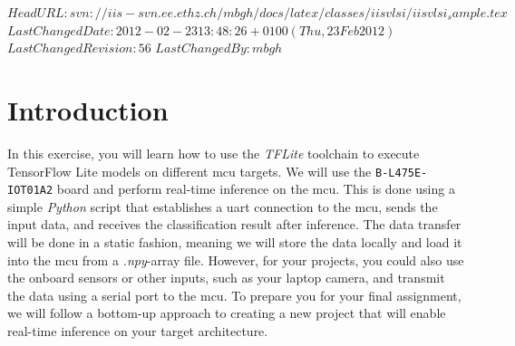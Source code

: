 \documentclass[parskip=half,notes,cadrem,toolver]{iisvlsi}
\begin{document}
%
%
%
\course{}
\coursenr{}
\docvers{}
\lastchange{}
%
%
%


%
\svnidlong
{$HeadURL: svn://iis-svn.ee.ethz.ch/mbgh/docs/latex/classes/iisvlsi/iisvlsi_sample.tex $}
{$LastChangedDate: 2012-02-23 13:48:26 +0100 (Thu, 23 Feb 2012) $}
{$LastChangedRevision: 56 $}
{$LastChangedBy: mbgh $}
%
%
\maketitle
%


%
\section{Introduction}

In this exercise, you will learn how to use the \textit{TFLite} toolchain to execute TensorFlow Lite models on different \gls{mcu} targets. We will use the \texttt{B-L475E-IOT01A2} board and perform real-time inference on the \gls{mcu}. This is done using a simple \textit{Python} script that establishes a \gls{uart} connection to the \gls{mcu}, sends the input data, and receives the classification result after inference. The data transfer will be done in a static fashion, meaning we will store the data locally and load it into the \gls{mcu} from a \textit{.npy}-array file. However, for your projects, you could also use the onboard sensors or other inputs, such as your laptop camera, and transmit the data using a serial port to the \gls{mcu}. To prepare you for your final assignment, we will follow a bottom-up approach to creating a new project that will enable real-time inference on your target architecture.
\end{document}
